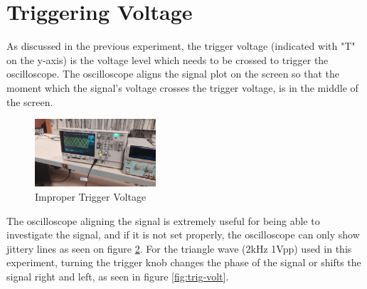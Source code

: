 \documentclass[a4paper, 12pt]{article}
\begin{document}
\begin{figure}[!h]
	\centering
	\hfill
	\caption{}
	\label{fig:rifa-edge}
\end{figure}

\section{Triggering Voltage}

As discussed in the previous experiment, the trigger voltage (indicated with "T" on the y-axis) is the voltage level which needs to be crossed to trigger the oscilloscope.
The oscilloscope aligns the signal plot on the screen so that the moment which the signal's voltage crosses the trigger voltage, is in the middle of the screen.

\begin{figure}
	\centering
	\includegraphics[width=0.4\textwidth]{3.3.jpg}
	\caption{Improper Trigger Voltage}
	\label{fig:bad-trig}
\end{figure}

The oscilloscope aligning the signal is extremely useful for being able to investigate the signal, and if it is not set properly, the oscilloscope can only show jittery lines as seen on figure \ref{fig:bad-trig}.
For the triangle wave (2kHz 1Vpp) used in this experiment, turning the trigger knob changes the phase of the signal or shifts the signal right and left, as seen in figure \ref{fig:trig-volt}.
\end{document}
